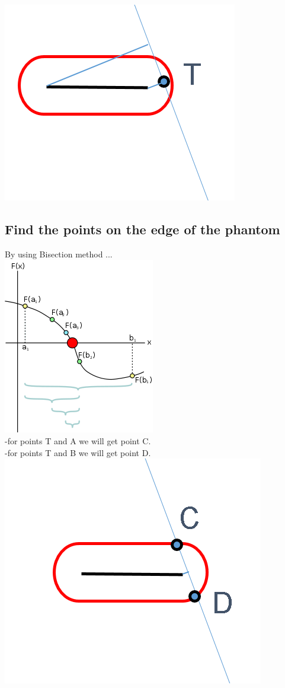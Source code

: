 \documentclass[12pt]{article}
\begin{document}
\includegraphics[scale=0.5]{pic07c.png}\\


\subsection{Find the points on the edge of the phantom}
By using Bisection method ...\\
\includegraphics[scale=0.5]{Bisection_method.png}\\
-for points T and A we will get point C.\\
-for points T and B we will get point D.\\

\includegraphics[scale=0.5]{pic08.png}\\
\end{document}
